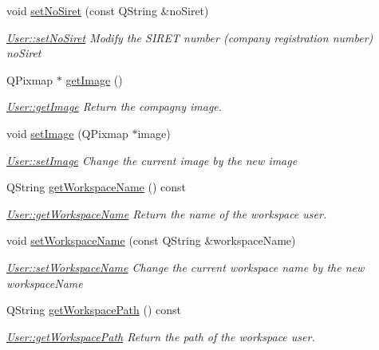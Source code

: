 \begin{DoxyCompactItemize}
void \hyperlink{classModels_1_1User_ae751ee06859dffce0cad08005c42c933}{set\-No\-Siret} (const Q\-String \&no\-Siret)
\begin{DoxyCompactList}\small\item\em \hyperlink{classModels_1_1User_ae751ee06859dffce0cad08005c42c933}{User\-::set\-No\-Siret} Modify the S\-I\-R\-E\-T number (company registration number) {\itshape no\-Siret} \end{DoxyCompactList}\item 
Q\-Pixmap $\ast$ \hyperlink{classModels_1_1User_a5cfe4bf41255daf93ac3a2488a858e00}{get\-Image} ()
\begin{DoxyCompactList}\small\item\em \hyperlink{classModels_1_1User_a5cfe4bf41255daf93ac3a2488a858e00}{User\-::get\-Image} Return the compagny image. \end{DoxyCompactList}\item 
void \hyperlink{classModels_1_1User_a3f717735993a5a73b5eeb84d64e0bc88}{set\-Image} (Q\-Pixmap $\ast$image)
\begin{DoxyCompactList}\small\item\em \hyperlink{classModels_1_1User_a3f717735993a5a73b5eeb84d64e0bc88}{User\-::set\-Image} Change the current image by the new {\itshape image} \end{DoxyCompactList}\item 
Q\-String \hyperlink{classModels_1_1User_adf4c52429656a4f44c15d879caee5b10}{get\-Workspace\-Name} () const 
\begin{DoxyCompactList}\small\item\em \hyperlink{classModels_1_1User_adf4c52429656a4f44c15d879caee5b10}{User\-::get\-Workspace\-Name} Return the name of the workspace user. \end{DoxyCompactList}\item 
void \hyperlink{classModels_1_1User_ae51aa34e41159fe7e4541a8cfddc50a3}{set\-Workspace\-Name} (const Q\-String \&workspace\-Name)
\begin{DoxyCompactList}\small\item\em \hyperlink{classModels_1_1User_ae51aa34e41159fe7e4541a8cfddc50a3}{User\-::set\-Workspace\-Name} Change the current workspace name by the new {\itshape workspace\-Name} \end{DoxyCompactList}\item 
Q\-String \hyperlink{classModels_1_1User_aa9421bda240316f9eebd0145f6dc3eda}{get\-Workspace\-Path} () const 
\begin{DoxyCompactList}\small\item\em \hyperlink{classModels_1_1User_aa9421bda240316f9eebd0145f6dc3eda}{User\-::get\-Workspace\-Path} Return the path of the workspace user. \end{DoxyCompactList}\item 

\end{DoxyCompactItemize}
